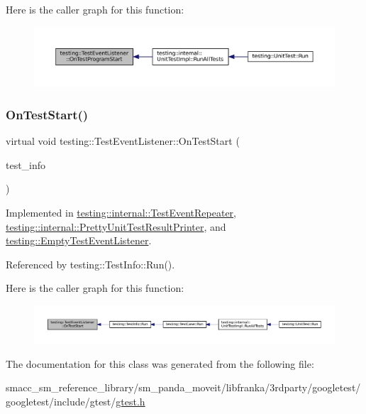 Here is the caller graph for this function\+:
\nopagebreak
\begin{figure}[H]
\begin{center}
\leavevmode
\includegraphics[width=350pt]{classtesting_1_1TestEventListener_a5f6c84f39851e8a603a2d2e10063816b_icgraph}
\end{center}
\end{figure}
\mbox{\label{classtesting_1_1TestEventListener_ab4f6a0ca16ae75daf385b3b5914e1048}} 
\subsubsection{\texorpdfstring{On\+Test\+Start()}{OnTestStart()}}
{\footnotesize\ttfamily virtual void testing\+::\+Test\+Event\+Listener\+::\+On\+Test\+Start (\begin{DoxyParamCaption}\item[{const \hyperlink{classtesting_1_1TestInfo}{Test\+Info} \&}]{test\+\_\+info }\end{DoxyParamCaption})\hspace{0.3cm}{\ttfamily [pure virtual]}}



Implemented in \hyperlink{classtesting_1_1internal_1_1TestEventRepeater_a70d694ca5010cc86cd458f7f529e6fbe}{testing\+::internal\+::\+Test\+Event\+Repeater}, \hyperlink{classtesting_1_1internal_1_1PrettyUnitTestResultPrinter_a5078ee71cfa97e37ae7a9366149195c5}{testing\+::internal\+::\+Pretty\+Unit\+Test\+Result\+Printer}, and \hyperlink{classtesting_1_1EmptyTestEventListener_a84fa74cc9ba742f9f847ea405ca84e5e}{testing\+::\+Empty\+Test\+Event\+Listener}.



Referenced by testing\+::\+Test\+Info\+::\+Run().

Here is the caller graph for this function\+:
\nopagebreak
\begin{figure}[H]
\begin{center}
\leavevmode
\includegraphics[width=350pt]{classtesting_1_1TestEventListener_ab4f6a0ca16ae75daf385b3b5914e1048_icgraph}
\end{center}
\end{figure}


The documentation for this class was generated from the following file\+:\begin{DoxyCompactItemize}
\item 
smacc\+\_\+sm\+\_\+reference\+\_\+library/sm\+\_\+panda\+\_\+moveit/libfranka/3rdparty/googletest/googletest/include/gtest/\hyperlink{gtest_8h}{gtest.\+h}\end{DoxyCompactItemize}
